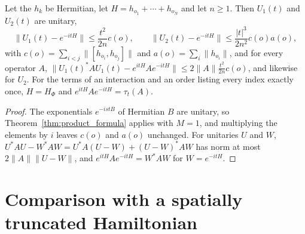\begin{theorem}
    \label{thm:dynamics_trotter_error}
    \leanok
    Let the $h_k$ be Hermitian, let $H=h_{o_1}+\cdots+h_{o_N}$ and let $n\geq1$.
    Then $U_1(t)$ and $U_2(t)$ are unitary,
    \[
        \lVert U_1(t)-e^{-itH}\rVert\leq\frac{t^2}{2n}c(o),\qquad
        \lVert U_2(t)-e^{-itH}\rVert\leq\frac{\lvert t\rvert^3}{2n^2}c(o)a(o),
    \]
    with $c(o)=\sum_{i<j}\lVert[h_{o_i},h_{o_j}]\rVert$ and
    $a(o)=\sum_i\lVert h_{o_i}\rVert$, and for every operator $A$,
    $\lVert U_1(t)^*AU_1(t)-e^{itH}Ae^{-itH}\rVert\leq2\lVert A\rVert\frac{t^2}{2n}c(o)$,
    and likewise for $U_2$. For the terms of an interaction and an order listing
    every index exactly once, $H=H_\Phi$ and $e^{itH}Ae^{-itH}=\tau_t(A)$.
\end{theorem}
\begin{proof}\leanok
    The exponentials $e^{-ist B}$ of Hermitian $B$ are unitary, so
    Theorem~\ref{thm:product_formula} applies with $M=1$, and multiplying the
    elements by $i$ leaves $c(o)$ and $a(o)$ unchanged. For unitaries $U$ and
    $W$, $U^*AU-W^*AW=U^*A(U-W)+(U-W)^*AW$ has norm at most
    $2\lVert A\rVert\lVert U-W\rVert$, and $e^{itH}Ae^{-itH}=W^*AW$ for
    $W=e^{-itH}$.
\end{proof}

\section{Comparison with a spatially truncated Hamiltonian}

